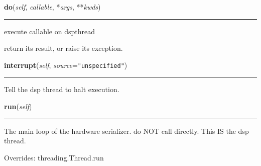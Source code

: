     \label{dsp:DspThread:do}

    \vspace{0.5ex}

    \begin{boxedminipage}{\textwidth}

    \raggedright \textbf{do}(\textit{self}, \textit{callable}, *\textit{args}, **\textit{kwds})

    \vspace{-1.5ex}

    \rule{\textwidth}{0.5\fboxrule}
    execute callable on dspthread

    return its result, or raise its exception.

    \vspace{1ex}

    \end{boxedminipage}

    \label{dsp:DspThread:interrupt}

    \vspace{0.5ex}

    \begin{boxedminipage}{\textwidth}

    \raggedright \textbf{interrupt}(\textit{self}, \textit{source}=\texttt{"unspecified"})

    \vspace{-1.5ex}

    \rule{\textwidth}{0.5\fboxrule}
    Tell the dsp thread to halt execution.

    \vspace{1ex}

    \end{boxedminipage}

    \vspace{0.5ex}

    \begin{boxedminipage}{\textwidth}

    \raggedright \textbf{run}(\textit{self})

    \vspace{-1.5ex}

    \rule{\textwidth}{0.5\fboxrule}
    The main loop of the hardware serializer. do NOT call directly. This IS
    the dsp thread.

    \vspace{1ex}

      Overrides: threading.Thread.run

    \end{boxedminipage}

